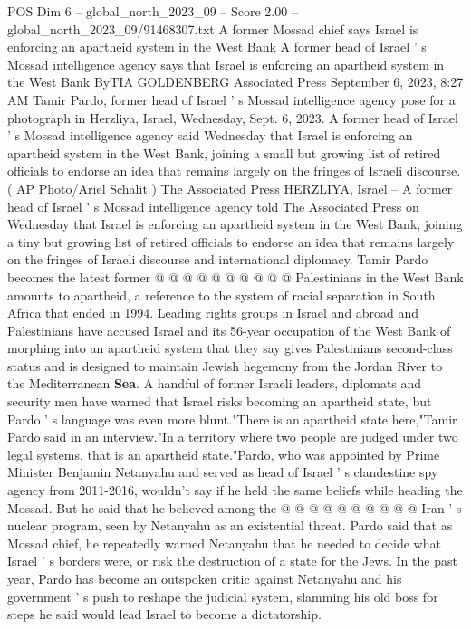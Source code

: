 \begin{textsample}{POS Dim 6 – global\_north\_2023\_09 – Score 2.00 – global\_north\_2023\_09/91468307.txt}  \label{ex:f6_pos_106}
A former Mossad chief says Israel is enforcing an apartheid system in the West Bank A former head of Israel ' s Mossad intelligence agency says that Israel is enforcing an apartheid system in the West Bank ByTIA GOLDENBERG Associated Press September 6, 2023, 8:27 AM Tamir Pardo, former head of Israel ' s Mossad intelligence agency pose for a photograph in Herzliya, Israel, Wednesday, Sept. 6, 2023.
A former head of Israel ' s Mossad intelligence agency said Wednesday that Israel is enforcing an apartheid system in the West Bank, joining a small but growing list of retired officials to endorse an idea that remains largely on the fringes of Israeli discourse. ( AP Photo/Ariel Schalit ) The Associated Press HERZLIYA, Israel -- A former head of Israel ' s Mossad intelligence agency told The Associated Press on Wednesday that Israel is enforcing an apartheid system in the West Bank, joining a tiny but growing list of retired officials to endorse an idea that remains largely on the fringes of Israeli discourse and international diplomacy.
Tamir Pardo becomes the latest former @ @ @ @ @ @ @ @ @ @ Palestinians in the West Bank amounts to apartheid, a reference to the system of racial separation in South Africa that ended in 1994.
Leading rights groups in Israel and abroad and Palestinians have accused Israel and its 56-year occupation of the West Bank of morphing into an apartheid system that they say gives Palestinians second-class status and is designed to maintain Jewish hegemony from the Jordan River to the Mediterranean \textbf{Sea}.
A handful of former Israeli leaders, diplomats and security men have warned that Israel risks becoming an apartheid state, but Pardo ' s language was even more blunt."There is an apartheid state here,"Tamir Pardo said in an interview."In a territory where two people are judged under two legal systems, that is an apartheid state."Pardo, who was appointed by Prime Minister Benjamin Netanyahu and served as head of Israel ' s clandestine spy agency from 2011-2016, wouldn't say if he held the same beliefs while heading the Mossad.
But he said that he believed among the @ @ @ @ @ @ @ @ @ @ Iran ' s nuclear program, seen by Netanyahu as an existential threat.
Pardo said that as Mossad chief, he repeatedly warned Netanyahu that he needed to decide what Israel ' s borders were, or risk the destruction of a state for the Jews.
In the past year, Pardo has become an outspoken critic against Netanyahu and his government ' s push to reshape the judicial system, slamming his old boss for steps he said would lead Israel to become a dictatorship.

\end{textsample}

